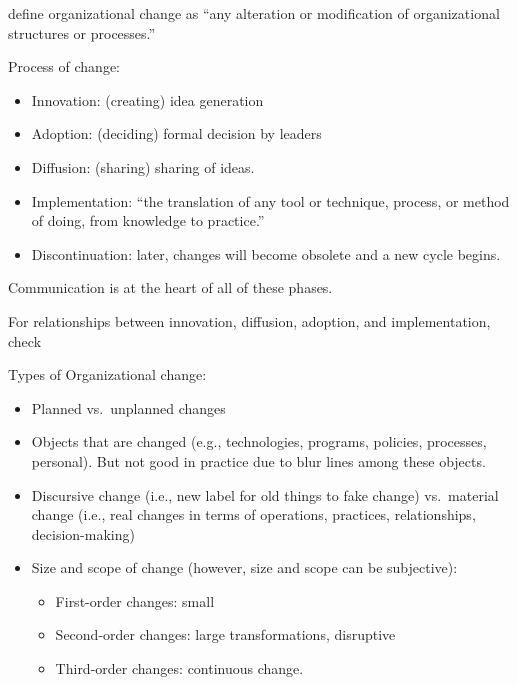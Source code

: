 \documentclass[
]{book}
\providecommand{\tightlist}{%
  \setlength{\itemsep}{0pt}\setlength{\parskip}{0pt}}
\begin{document}
\citep[p.10]{Zorn_1999} define organizational change as ``any alteration or modification of organizational structures or processes.''

Process of change:

\begin{itemize}
\tightlist
\item
  Innovation: (creating) idea generation\\
\item
  Adoption: (deciding) formal decision by leaders\\
\item
  Diffusion: (sharing) sharing of ideas.\\
\item
  Implementation: ``the translation of any tool or technique, process, or method of doing, from knowledge to practice.'' \citep{Tornatzky_1982}
\item
  Discontinuation: later, changes will become obsolete and a new cycle begins.
\end{itemize}

Communication is at the heart of all of these phases.

For relationships between innovation, diffusion, adoption, and implementation, check \citep[pp.~35]{Lewis_2019}

Types of Organizational change:

\begin{itemize}
\item
  Planned vs.~unplanned changes
\item
  Objects that are changed (e.g., technologies, programs, policies, processes, personal). But not good in practice due to blur lines among these objects.
\item
  Discursive change (i.e., new label for old things to fake change) vs.~material change (i.e., real changes in terms of operations, practices, relationships, decision-making) \citep[pp.10]{Zorn_1999}\\
\item
  Size and scope of change \citep{Bartunek_1987} (however, size and scope can be subjective):

  \begin{itemize}
  \tightlist
  \item
    First-order changes: small\\
  \item
    Second-order changes: large transformations, disruptive\\
  \item
    Third-order changes: continuous change.
  \end{itemize}
\end{itemize}
\end{document}
